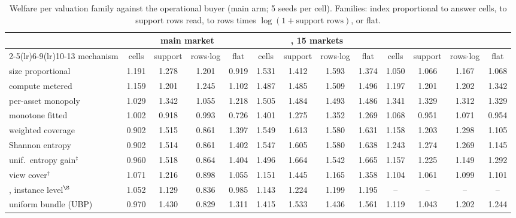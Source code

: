 
\begin{table}[tp]
  \centering
  \footnotesize
  \setlength{\tabcolsep}{3pt}
  \caption{Welfare per valuation family against the operational buyer (main arm; 5 seeds per cell). Families: index proportional to answer cells, to support rows read, to rows times $\log(1 + \text{support rows})$, or flat.}
  \label{tab:app-family-welfare}
  \begin{tabular}{@{}lcccccccccccc@{}}
    \toprule
    & \multicolumn{4}{c}{\sqlshare{} main market} & \multicolumn{4}{c}{\sqlshare{}, 15 markets} & \multicolumn{4}{c}{\tpch{}} \\
    \cmidrule(lr){2-5}\cmidrule(lr){6-9}\cmidrule(lr){10-13}
    mechanism & cells & support & rows$\cdot$log & flat & cells & support & rows$\cdot$log & flat & cells & support & rows$\cdot$log & flat \\
    \midrule
    size proportional & 1.191 & 1.278 & 1.201 & 0.919 & 1.531 & 1.412 & 1.593 & 1.374 & 1.050 & 1.066 & 1.167 & 1.068 \\
    compute metered & 1.159 & 1.201 & 1.245 & 1.102 & 1.487 & 1.485 & 1.509 & 1.496 & 1.197 & 1.201 & 1.202 & 1.342 \\
    per-asset monopoly & 1.029 & 1.342 & 1.055 & 1.218 & 1.505 & 1.484 & 1.493 & 1.486 & 1.341 & 1.329 & 1.312 & 1.329 \\
    monotone fitted & 1.002 & 0.918 & 0.993 & 0.726 & 1.401 & 1.275 & 1.352 & 1.269 & 1.068 & 0.951 & 1.071 & 0.954 \\
    \midrule
    \qirana{} weighted coverage & 0.902 & 1.515 & 0.861 & 1.397 & 1.549 & 1.613 & 1.580 & 1.631 & 1.158 & 1.203 & 1.298 & 1.105 \\
    \qirana{} Shannon entropy & 0.902 & 1.514 & 0.861 & 1.402 & 1.547 & 1.605 & 1.580 & 1.638 & 1.243 & 1.274 & 1.269 & 1.145 \\
    \qirana{} unif.\ entropy gain$^{\ddagger}$ & 0.960 & 1.518 & 0.864 & 1.404 & 1.496 & 1.664 & 1.542 & 1.665 & 1.157 & 1.225 & 1.149 & 1.292 \\
    \querymarket{} view cover$^{\dagger}$ & 1.071 & 1.216 & 0.898 & 1.055 & 1.151 & 1.445 & 1.165 & 1.358 & 1.104 & 1.061 & 1.099 & 1.101 \\
    \querymarket{}, instance level$^{\S}$ & 1.052 & 1.129 & 0.836 & 0.985 & 1.143 & 1.224 & 1.199 & 1.195 & -- & -- & -- & -- \\
    \midrule
    uniform bundle (UBP) & 0.970 & 1.430 & 0.829 & 1.311 & 1.415 & 1.533 & 1.436 & 1.561 & 1.119 & 1.043 & 1.202 & 1.244 \\

\end{tabular}
\end{table}
